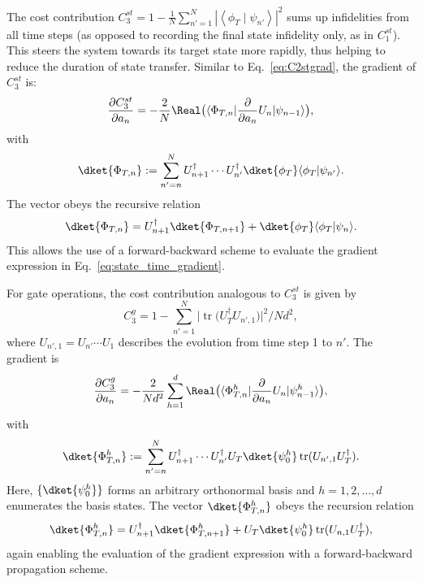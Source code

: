 The cost contribution $C_3^{st}=1-\frac{1}{N}\sum_{n'=1}^N \left|\left\langle\phi_{T} \mid \psi_{n'}\right\rangle\right|^{2}$ sums up infidelities from all time steps (as opposed to recording the final state infidelity only, as in $C_1^{st}$). This steers the system towards its target state more rapidly, thus helping to reduce the duration of state transfer. Similar to Eq.~\eqref{eq:C2stgrad}, the gradient of $C_3^{st}$ is:
\begin{equation}
\begin{aligned}
\label{eq:state_time_gradient}
  \frac{\partial C_3^{st} }{\partial a_{n}}
  &=-\frac{2}{N}\Real\big(\langle \Phi_{T,n}|\frac {\partial }{\partial a_{n}}U_n|\psi_{n-1}\rangle\big) ,\\
\end{aligned}
\end{equation}
with 
\begin{equation}
    \dket{\Phi_{T,n}}:=\sum_{n'=n}^NU_{n+1}^\dagger \cdots U_{n'}^\dagger\dket{\phi_T}\langle\phi_{T}|\psi_{n'}\rangle.
\end{equation}
The vector obeys the recursive relation
\begin{equation}
\dket{\Phi_{T,n}}=U^\dagger_{n+1}\dket{\Phi_{T,n+1}}+\dket{\phi_T}\langle\phi_T|\psi_n\rangle.
\end{equation}
This allows the use of a forward-backward scheme to evaluate the gradient expression in Eq.~\eqref{eq:state_time_gradient}.

For gate operations, the cost contribution analogous to $C_3^{st}$ is given by 
\begin{equation}
    C_3^{ g}=1- \sum_{n'=1}^N\big|\operatorname{tr}\big(U_T^\dagger  U_{n',1}\big)\big|^{2}/Nd^2,
\end{equation}
where $U_{n',1}=U_{n'}\cdots U_1$ describes the evolution from time step 1 to $n'$. The gradient is
\begin{equation}
  \frac{\partial C_3^{ g} }{\partial a_{n}}=
  -\frac{2}{Nd^2}\sum_{h=1}^d \Real  \big(\langle \Phi_{T,n}^h|\frac {\partial }{\partial a_{n}}U_n|\psi_{n-1}^h\rangle\big),
\end{equation}
with
\begin{equation}
\dket{\Phi_{T,n}^h}:=\sum_{n'=n}^N U_{n+1}^\dagger \cdots U_{n'}^\dagger U_T\dket{\psi_0^h} \operatorname{tr}( U_{n',1}U_T^{\dagger}).
\end{equation}
Here, $\{\dket{\psi_0^h}\}$ forms an arbitrary orthonormal basis and 
$h=1,2,\ldots,d$ enumerates the basis states. The vector $\dket{\Phi_{T,n}^h}$ obeys the recursion relation
\begin{equation}
\dket{\Phi_{T,n}^h}=U_{n+1}^\dagger\dket{\Phi_{T,n+1}^h}+U_T\dket{\psi_0^h}\operatorname{tr}( U_{n,1}U_T^{\dagger}),
\end{equation}
again enabling the evaluation of the gradient expression with a forward-backward propagation scheme.

